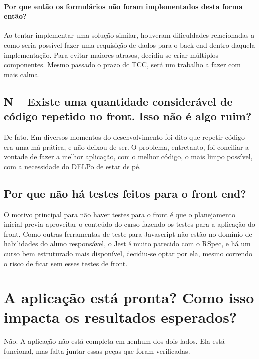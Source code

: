 \paragraph{Por que então os formulários não foram implementados desta forma então?} Ao tentar implementar uma
solução similar, houveram dificuldades relacionadas a como seria possível fazer uma requisição de dados para o
back end dentro daquela implementação.
Para evitar maiores atrasos, decidiu-se criar múltiplos componentes.
Mesmo passado o prazo do TCC, será um trabalho a fazer com mais calma.

\subsection{N -- Existe uma quantidade considerável de código repetido no front. Isso não é algo ruim?}
\label{subsec:no-dry}

De fato. Em diversos momentos do desenvolvimento foi dito que repetir código era uma má prática, e não deixou
de ser. O problema, entretanto, foi conciliar a vontade de fazer a melhor aplicação, com o melhor código, o
mais limpo possível, com a necessidade do DELPo de estar de pé.

\subsection{Por que não há testes feitos para o front end?}\label{subsec:no-tests-for-nuxt}

O motivo principal para não haver testes para o front é que o planejamento inicial previa aproveitar o conteúdo
do curso \href{https://vueschool.io/courses/learn-how-to-test-vuejs-components}{}
fazendo os testes para a aplicação do front.
Como outras ferramentas de teste para Javascript não estão no domínio de habilidades do aluno responsável, o
Jest é muito  parecido com o RSpec, e há um curso bem estruturado mais disponível, decidiu-se optar por ela,
mesmo correndo o risco de ficar sem esses testes de front.

\section{A aplicação está pronta? Como isso impacta os resultados esperados?}
\label{sec:is-it-ready}

Não. A aplicação não está completa em nenhum dos dois lados. Ela está funcional, mas falta juntar essas peças que foram
verificadas.

